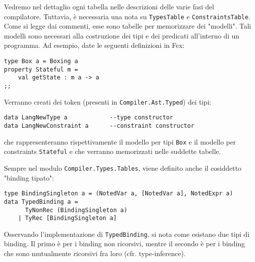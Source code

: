 \documentclass[10pt,a4paper]{article}
\begin{document}
Vedremo nel dettaglio ogni tabella nelle descrizioni delle varie fasi del compilatore. Tuttavia, è necessaria una nota
su \texttt{TypesTable} e \texttt{ConstraintsTable}. Come si legge dai commenti, esse sono tabelle per memorizzare dei
"modelli". Tali modelli sono necessari alla costruzione dei tipi e dei predicati all'interno di un programma. Ad esempio,
date le seguenti definizioni in Fex:
\begin{lstlisting}
type Box a = Boxing a
property Stateful m =
    val getState : m a -> a
;;
\end{lstlisting}
Verranno creati dei token (presenti in \texttt{Compiler.Ast.Typed}) dei tipi:
\begin{lstlisting}
data LangNewType a            --type constructor
data LangNewConstraint a      --constraint constructor
\end{lstlisting}
che rappresenteranno rispettivamente il modello per tipi \texttt{Box} e il modello per constraints \texttt{Stateful} e che
verranno memorizzati nelle suddette tabelle.

Sempre nel modulo \texttt{Compiler.Types.Tables}, viene definito anche il cosiddetto "binding tipato":
\begin{lstlisting}
type BindingSingleton a = (NotedVar a, [NotedVar a], NotedExpr a)
data TypedBinding a =
      TyNonRec (BindingSingleton a)
    | TyRec [BindingSingleton a]
\end{lstlisting}
Osservando l'implementazione di \texttt{TypedBinding}, si nota come esistano due tipi di binding. Il primo è per i binding
non ricorsivi, mentre il secondo è per i binding che sono mutualmente ricorsivi fra loro (cfr. type-inference).
\end{document}
